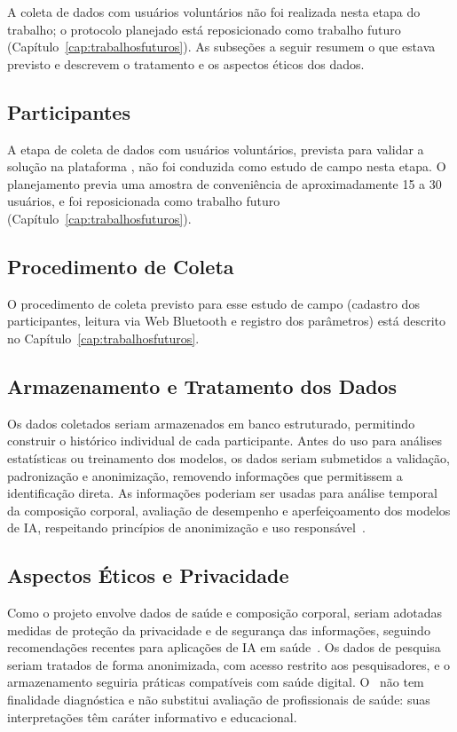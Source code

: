 A coleta de dados com usuários voluntários não foi realizada nesta etapa do trabalho; o
protocolo planejado está reposicionado como trabalho futuro
(Capítulo~\ref{cap:trabalhosfuturos}). As subseções a seguir resumem o que estava previsto
e descrevem o tratamento e os aspectos éticos dos dados.

\subsection{Participantes}

A etapa de coleta de dados com usuários voluntários, prevista para validar a solução na
plataforma \sintonia, não foi conduzida como estudo de campo nesta etapa. O planejamento
previa uma amostra de conveniência de aproximadamente 15 a 30 usuários, e foi
reposicionada como trabalho futuro (Capítulo~\ref{cap:trabalhosfuturos}).

\subsection{Procedimento de Coleta}

O procedimento de coleta previsto para esse estudo de campo (cadastro dos participantes,
leitura via Web Bluetooth e registro dos parâmetros) está descrito no
Capítulo~\ref{cap:trabalhosfuturos}.

\subsection{Armazenamento e Tratamento dos Dados}

Os dados coletados seriam armazenados em banco estruturado, permitindo construir o
histórico individual de cada participante. Antes do uso para análises estatísticas ou
treinamento dos modelos, os dados seriam submetidos a validação, padronização e
anonimização, removendo informações que permitissem a identificação direta. As informações
poderiam ser usadas para análise temporal da composição corporal, avaliação de desempenho
e aperfeiçoamento dos modelos de IA, respeitando princípios de anonimização e uso
responsável~\cite{etic2024}.

\subsection{Aspectos Éticos e Privacidade}

Como o projeto envolve dados de saúde e composição corporal, seriam adotadas medidas de
proteção da privacidade e de segurança das informações, seguindo recomendações recentes
para aplicações de IA em saúde~\cite{etic2024}. Os dados de pesquisa seriam tratados de
forma anonimizada, com acesso restrito aos pesquisadores, e o armazenamento seguiria
práticas compatíveis com saúde digital. O \sintonia\ não tem finalidade diagnóstica e não
substitui avaliação de profissionais de saúde: suas interpretações têm caráter informativo
e educacional.

